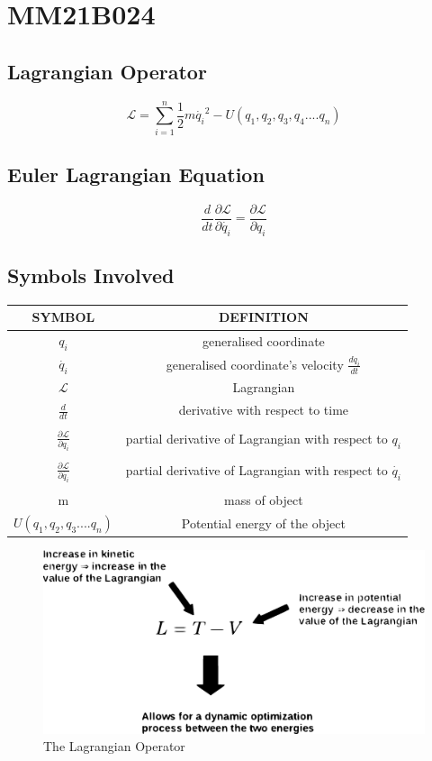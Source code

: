 \section{MM21B024}
\subsection{Lagrangian Operator}
\[\mathcal{L} = \sum_{i=1} ^ {n} \frac{1}{2} m\Dot{q_i}^2 - U(q_1,q_2,q_3,q_4....q_n)\]
\subsection{Euler Lagrangian Equation}
\[\frac{d}{dt} \frac{\partial \mathcal{L}}{\partial \Dot{q_i}} = \frac{\partial \mathcal{L}}{\partial {q_i}}\]

\subsection{Symbols Involved}
\begin{tabular}{|c|c|}
    \hline
    SYMBOL & DEFINITION \\
    \hline
    $q_i$ & generalised coordinate \\\hline
    $\Dot{q_i}$ & generalised coordinate's velocity $\frac{dq_i}{dt}$ \\\hline
    $\mathcal{L}$ & Lagrangian \\\hline
    $\frac{d}{dt}$ & derivative with respect to time  \\ & \\\hline
    $\frac{\partial \mathcal{L}}{\partial q_i}$ & partial derivative of Lagrangian with respect to $q_i$\\ & \\\hline
    $\frac{\partial \mathcal{L}}{{\partial \Dot{q_i}}}$& partial derivative of Lagrangian with respect to $\Dot{q_i}$\\ & \\\hline
   m & mass of object \\\hline
   $U(q_1,q_2,q_3....q_n)$ & Potential energy of the object \\\hline
    \end{tabular}
    \begin{figure}[ht]
        \centering
        \includegraphics[width=\textwidth]{./MM21B024/image-29.eps}
        \caption{The Lagrangian Operator}
        \label{fig:my_label}
    \end{figure}
    
